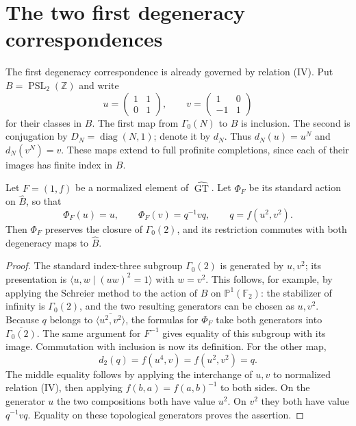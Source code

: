 \section{The two first degeneracy correspondences}
The first degeneracy correspondence is already governed by relation (IV).
Put $B=\operatorname{PSL}_2(\mathbb Z)$ and write
\[
 u=\begin{pmatrix}1&1\\0&1\end{pmatrix},\qquad
 v=\begin{pmatrix}1&0\\-1&1\end{pmatrix}
\]
for their classes in $B$. The first map from $\Gamma_0(N)$ to $B$ is inclusion.
The second is conjugation by $D_N=\operatorname{diag}(N,1)$; denote it by $d_N$.
Thus $d_N(u)=u^N$ and $d_N(v^N)=v$. These maps extend to full profinite completions,
since each of their images has finite index in $B$.

\begin{proposition}\label{prop:degeneracy-two}
Let $F=(1,f)$ be a normalized element of $\widehat{\operatorname{GT}}$.
Let $\Phi_F$ be its standard action on $\widehat B$, so that
\[
 \Phi_F(u)=u,\qquad
 \Phi_F(v)=q^{-1}vq,\qquad q=f(u^2,v^2).
\]
Then $\Phi_F$ preserves the closure of $\Gamma_0(2)$, and its restriction
commutes with both degeneracy maps to $\widehat B$.
\end{proposition}
\begin{proof}
The standard index-three subgroup $\Gamma_0(2)$ is generated by $u,v^2$;
its presentation is $\langle u,w\mid(uw)^2=1\rangle$ with $w=v^2$.
This follows, for example, by applying the Schreier method to the action of
$B$ on $\mathbb P^1(\mathbb F_2)$: the stabilizer of infinity is $\Gamma_0(2)$,
and the two resulting generators can be chosen as $u,v^2$.
Because $q$ belongs to $\overline{\langle u^2,v^2\rangle}$, the formulas for
$\Phi_F$ take both generators into $\overline{\Gamma_0(2)}$.
The same argument for $F^{-1}$ gives equality of this subgroup with its image.
Commutation with inclusion is now its definition. For the other map,
\[
 d_2(q)=f(u^4,v)=f(u^2,v^2)=q.
\]
The middle equality follows by applying the interchange of $u,v$ to normalized
relation (IV), then applying $f(b,a)=f(a,b)^{-1}$ to both sides.
On the generator $u$ the two compositions both have value $u^2$.
On $v^2$ they both have value $q^{-1}vq$. Equality on these topological
generators proves the assertion.
\end{proof}

